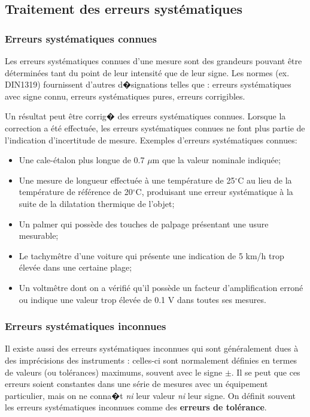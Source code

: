 \subsection{Traitement des erreurs systématiques}

\subsubsection{Erreurs systématiques connues}

Les erreurs systématiques connues d'une mesure sont des grandeurs pouvant être déterminées tant du point de leur intensité que de leur signe. Les normes (ex. DIN1319) fournissent d'autres d�signations telles que : erreurs systématiques avec signe connu, erreurs systématiques pures, erreurs corrigibles.

Un résultat peut être corrig� des erreurs systématiques connues. Lorsque la correction a été effectuée, les erreurs systématiques connues ne font plus partie de l'indication d'incertitude de mesure. Exemples d'erreurs systématiques connues:
\begin{itemize}\itemsep2pt
\renewcommand{\labelitemi}{$\bullet$}
\item Une cale-étalon plus longue de 0.7 $\mu$m que la valeur nominale indiquée;
\item Une mesure de longueur effectuée à une température de 25$^{\circ}$C au lieu de la température de référence de 20$^{\circ}$C, produisant une erreur systématique à la suite de la dilatation thermique de l'objet;
\item Un palmer qui possède des touches de palpage présentant une usure mesurable;
\item Le tachymêtre d'une voiture qui présente une indication de 5 km/h trop élevée dans une certaine plage;
\item Un voltmêtre dont on a vérifié qu'il possède un facteur d'amplification erroné ou indique une valeur trop élevée de 0.1 V dans toutes ses mesures.
\end{itemize}

\subsubsection{Erreurs systématiques inconnues}

Il existe aussi des erreurs systématiques inconnues qui sont généralement dues à des imprécisions des instruments : celles-ci sont normalement définies en termes de valeurs (ou tolérances) maximums, souvent avec le signe $\pm$. Il se peut que ces erreurs soient constantes dans une série de mesures avec un équipement particulier, mais on ne conna�t \textit{ni} leur valeur \textit{ni} leur signe. On définit souvent les erreurs systématiques inconnues comme des \textbf{erreurs de tolérance}.

